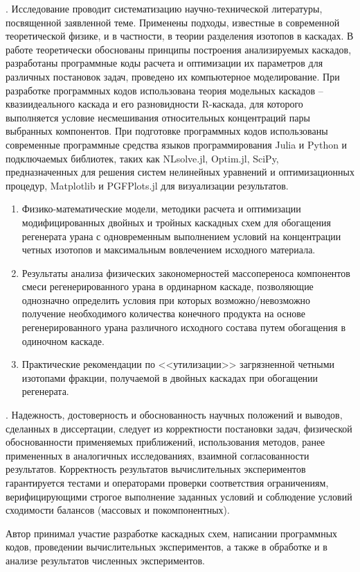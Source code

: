 {\methods}.
Исследование проводит систематизацию научно-технической литературы, посвященной заявленной теме.
Применены подходы, известные в современной теоретической физике, и в частности, в теории разделения изотопов в каскадах.
В работе теоретически обоснованы принципы построения анализируемых каскадов, разработаны программные коды расчета и оптимизации их параметров для различных постановок задач, проведено их компьютерное моделирование.
При разработке программных кодов использована теория модельных каскадов -- квазиидеального каскада и его разновидности R-каскада, для которого выполняется условие несмешивания относительных концентраций пары выбранных компонентов. При подготовке программных кодов использованы современные программные средства языков программирования Julia и Python и подключаемых библиотек, таких как NLsolve.jl, Optim.jl, SciPy, предназначенных для решения систем нелинейных уравнений и оптимизационных процедур, Matplotlib и PGFPlots.jl для визуализации результатов.


{}
\begin{enumerate}
  \item Физико-математические модели, методики расчета и оптимизации модифицированных двойных и тройных каскадных схем для обогащения регенерата урана с одновременным выполнением условий на концентрации четных изотопов и максимальным вовлечением исходного материала.
  \item Результаты анализа физических закономерностей массопереноса компонентов смеси регенерированного урана в ординарном каскаде, позволяющие однозначно определить условия при которых возможно/невозможно получение необходимого количества конечного продукта на основе регенерированного урана различного исходного состава путем обогащения в одиночном каскаде.
  \item Практические рекомендации по <<утилизации>> загрязненной четными изотопами фракции, получаемой в двойных каскадах при обогащении регенерата. 
\end{enumerate}

{\reliability}.
Надежность, достоверность и обоснованность научных положений и выводов, сделанных в диссертации, следует из корректности постановки задач, физической обоснованности применяемых приближений, использования методов, ранее примененных в аналогичных исследованиях, взаимной согласованности результатов. Корректность результатов вычислительных экспериментов гарантируется тестами и операторами проверки соответствия ограничениям, верифицирующими строгое выполнение заданных условий и соблюдение условий сходимости балансов (массовых и покомпонентных).


{\contribution} Автор принимал участие разработке каскадных схем, написании программных кодов, проведении вычислительных экспериментов, а также в обработке и в анализе результатов численных экспериментов.


